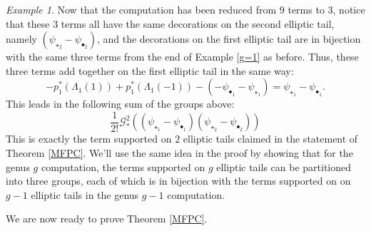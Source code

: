 \documentclass[leqno,12pt]{amsart}
\theoremstyle{remark}
\newtheorem{example}[theorem]{Example}
\numberwithin{equation}{section}
\begin{document}
\begin{example}
Now that the computation has been reduced from $9$ terms to $3$, notice that these $3$ terms all have the same decorations on the second elliptic tail, namely $(\psi_{\star_2}-\psi_{\bullet_2})$, and the decorations on the first elliptic tail are in bijection with the same three terms from the end of Example \ref{g=1} as before. Thus, these three terms add together  on the first elliptic tail in the same way:
$$
-p_1^\ast(\Lambda_{1}(1)) + p_1^\ast(\Lambda_{1}(-1)) - (-\psi_{\bullet_1}-\psi_{\star_1}) = \psi_{\star_1}-\psi_{\bullet_1}.
$$
This leads in the following sum of the groups above:
$$
\frac{1}{2!}\mathcal{G}_*^2((\psi_{\star_1}-\psi_{\bullet_1})(\psi_{\star_2}-\psi_{\bullet_2}))
$$
This is exactly the term supported on $2$ elliptic tails claimed in the statement of Theorem \ref{MFPC}. We'll use the same idea in the proof by showing that for the genus $g$ computation,  the terms supported on $g$ elliptic tails  can be partitioned into three groups, each of which is in bijection with the terms supported on on $g-1$ elliptic tails in the genus $g-1$ computation.
\end{example}

We are now ready to prove Theorem \ref{MFPC}.
\end{document}
